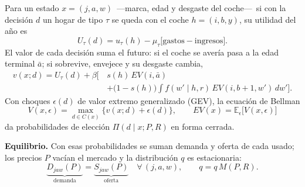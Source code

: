 \documentclass[border=0pt]{standalone}
\begin{document}
\begin{minipage}{26.783cm}\fontsize{27}{33.5}\selectfont\raggedright 
Para un estado $x=(j,a,w)$ \,---marca, edad y desgaste del coche---\, si con la
decisión $d$ un hogar de tipo $\tau$ se queda con el coche $h=(i,b,y)$, su utilidad
del año es
\[ U_\tau(d)=u_\tau(h)-\mu_\tau\Big[\text{gastos}-\text{ingresos}\Big]. \]
El valor de cada decisión suma el futuro: si el coche se avería pasa a la edad
terminal $\bar a$; si sobrevive, envejece y su desgaste cambia,
\[ \begin{aligned} v(x;d)=U_\tau(d)+\beta\Big[\,&s(h)\,EV(i,\bar a)\\
   &+\big(1-s(h)\big)\!\int\! f(w'\mid h,r)\,EV(i,b{+}1,w')\,dw'\Big]. \end{aligned} \]
Con choques $\epsilon(d)$ de valor extremo generalizado (GEV), la ecuación de Bellman
\[ V(x,\epsilon)=\max_{d\in C(x)}\Big\{v(x;d)+\epsilon(d)\Big\},\qquad
   EV(x)=\mathbb{E}_\epsilon\Big[V(x,\epsilon)\Big] \]
da probabilidades de elección $\Pi(d\mid x;P,R)$ en forma cerrada.

\textbf{Equilibrio.} Con esas probabilidades se suman demanda y oferta de cada
usado; los precios $P$ vacían el mercado y la distribución $q$ es estacionaria:
\[ \underbrace{D_{jaw}(P)}_{\text{demanda}}=\underbrace{S_{jaw}(P)}_{\text{oferta}}
   \quad\forall\,(j,a,w),\qquad q=q\,M(P,R). \]
\end{minipage}
\end{document}
